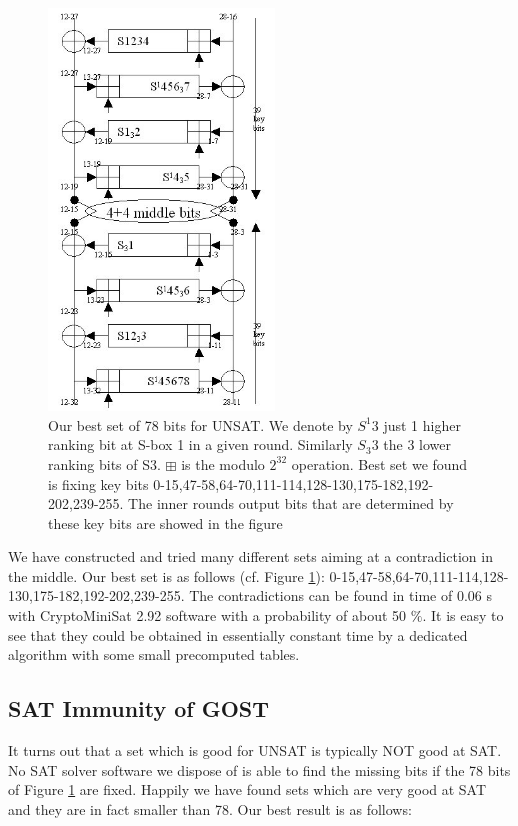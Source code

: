 \begin{figure}[h]
	\centering
	\includegraphics[width=60mm]{./pics/gost81optimal4KP.jpg}
	\caption[Our best set of 78 bits for UNSAT]{Our best set of 78 bits for UNSAT. We denote by $S^{1}3$ just 1 higher ranking bit at S-box 1 in a given round.
		Similarly $S_{3}3$ the 3 lower ranking bits of S3. $\boxplus$ is the modulo $2^{32}$ operation. Best set we found is fixing key bits 0-15,47-58,64-70,111-114,128-130,175-182,192-202,239-255. The inner rounds output bits that are determined by these key bits are showed in the figure   }
	\label{Gost81optimal4KPUNSAT78}
\end{figure}

We have constructed and tried many different sets aiming at a contradiction in the middle.
Our best set is as follows (cf. Figure \ref{Gost81optimal4KPUNSAT78}):
0-15,47-58,64-70,111-114,128-130,175-182,192-202,239-255.
The contradictions can be found in time of 0.06 s
with CryptoMiniSat 2.92 software \cite{CryptoMiniSat}
with a probability of about 50 $\%$.
It is easy to see that they could be obtained in essentially constant time
by a dedicated algorithm with some small precomputed tables.

\subsection{SAT Immunity of GOST}
It turns out that a set which is good for UNSAT is typically NOT good at SAT.
No SAT solver software we dispose of is able to find the missing bits if the 78 bits of Figure \ref{Gost81optimal4KPUNSAT78} are fixed.
Happily we have found sets which are very good at SAT and they are in fact smaller than 78.
Our best result is as follows:


